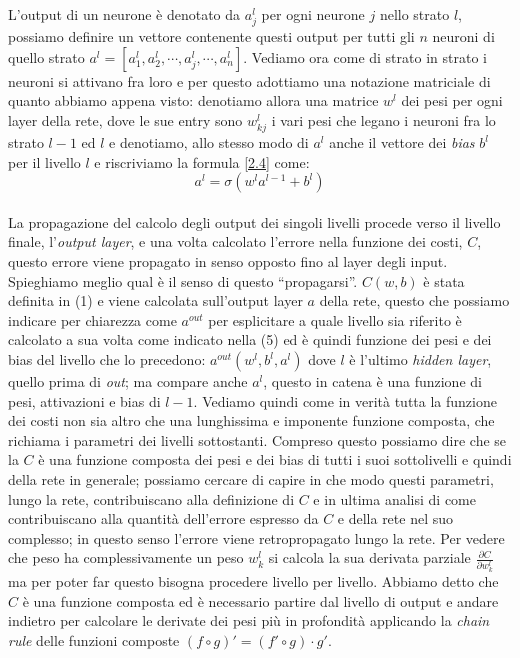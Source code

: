 L'output di un neurone è denotato da $ a^{l}_{j} $ per ogni neurone $j$ nello strato $l$, possiamo definire un vettore contenente questi output per tutti gli $n$ neuroni di quello strato $a^{l} = \left[a^{l}_{1},a^{l}_{2}, \cdots, a^{l}_{j}, \cdots, a^{l}_{n}  \right] $. Vediamo ora come di strato in strato i neuroni si attivano fra loro e per questo adottiamo una notazione matriciale di quanto abbiamo appena visto: denotiamo allora una matrice $w^{l}$ dei pesi per ogni layer della rete, dove le sue entry sono $w^{l}_{kj}$ i vari pesi che legano i neuroni fra lo strato $l-1$ ed $l$ e denotiamo, allo stesso modo di $a^{l}$ anche il vettore dei \textit{bias} $b^{l}$ per il livello $l$ e riscriviamo la formula \ref{2.4} come:
\begin{equation}
	a^{l}=\sigma\left( w^{l}a^{l-1}+b^{l}\right)
\end{equation}
\\
La propagazione del calcolo degli output dei singoli livelli procede verso il livello finale, l'\textit{output layer}, e una volta calcolato l'errore nella funzione dei costi, $C$, questo errore viene propagato in senso opposto fino al layer degli input. Spieghiamo meglio qual è il senso di questo ``propagarsi''. 
$C(w,b)$ è stata definita in (1) e viene calcolata sull'output layer $a$ della rete, questo che possiamo indicare per chiarezza come $a^{out}$ per esplicitare a quale livello sia riferito è calcolato a sua volta come indicato nella (5) ed   è quindi funzione dei pesi e dei bias del livello che lo precedono: $ a^{out}(w^{l},b^{l}, a^{l})$ dove $l$ è l'ultimo \textit{hidden layer}, quello prima di \textit{out}; ma compare anche $a^{l}$, questo in catena è una funzione di pesi, attivazioni e bias di $l-1$. Vediamo quindi come in verità tutta la funzione dei costi non sia altro che una lunghissima e imponente funzione composta, che richiama i parametri dei livelli sottostanti. Compreso questo possiamo dire che se la $C$ è una funzione composta dei pesi e dei bias di tutti i suoi sottolivelli e quindi della rete in generale; possiamo cercare di capire in che modo questi parametri, lungo la rete, contribuiscano alla definizione di $C$ e in ultima analisi di come contribuiscano alla quantità dell'errore espresso da $C$ e della rete nel suo complesso; in questo senso l'errore viene retropropagato lungo la rete. Per vedere che peso ha complessivamente un peso $w_{k}^{l}$ si calcola la sua derivata parziale $\frac{\partial C}{\partial w_{k}^{l}}$ ma per poter far questo bisogna procedere livello per livello. Abbiamo detto che $C$ è una funzione composta ed è necessario partire dal livello di output e andare indietro per calcolare le derivate dei pesi più in profondità applicando la \textit{chain rule} delle funzioni composte $(f \circ g)'=(f' \circ g) \cdot g' $.
